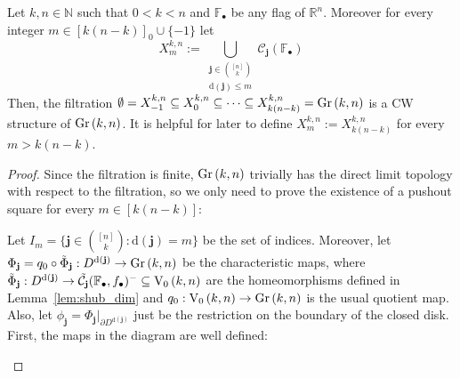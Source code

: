 \begin{theorem}\label{thm:gr_is_cw} Let $k,n\in\mathbb{N}$ such that $0<k<n$ and $\mathbb{F}_{\bullet}$ be any flag of $\mathbb{R}^n$. Moreover for every integer $m\in[k(n-k)]_0\cup\{-1\}$ let \[X_m^{k,n}:=\bigcup_{\substack{\mathbf{j}\in\binom{[n]}{k}\\\mathrm{d}(\mathbf{j})\leq m}}\mathcal{C}_{\mathbf{j}}(\mathbb{F}_{\bullet})\]
Then, the filtration $\emptyset=X_{-1}^{k,n}\subseteq X_0^{k,n}\subseteq\cdots\subseteq X_{k(n-k)}^{k,n}=\Gr{k}{n}$ is a CW structure of $\Gr{k}{n}$. It is helpful for later to define $X_m^{k,n}:=X_{k(n-k)}^{k,n}$ for every $m>k(n-k)$.
\end{theorem}
\begin{proof}
Since the filtration is finite, $\Gr{k}{n}$ trivially has the direct limit topology with respect to the filtration, so we only need to prove the existence of a pushout square for every $m\in[k(n-k)]$:
\begin{center}
\end{center}
Let $I_m=\big\{\mathbf{j}\in\binom{[n]}{k}:\mathrm{d}(\mathbf{j})=m\big\}$ be the set of indices. Moreover, let $\Phi_{\mathbf{j}}=q_0\circ\tilde{\Phi}_{\mathbf{j}}:D^{\mathrm{d}(\mathbf{j})}\to \Gr{k}{n}$ be the characteristic maps, where $\tilde{\Phi}_{\mathbf{j}}:D^{\mathrm{d}(\mathbf{j})}\to\tilde{\mathcal{C}}_{\mathbf{j}}(\mathbb{F}_{\bullet},f_{\bullet})^-\subseteq\StO{k}{n}$ are the homeomorphisms defined in Lemma~\ref{lem:shub_dim} and $q_0:\StO{k}{n}\to\Gr{k}{n}$ is the usual quotient map. Also, let $\phi_{\mathbf{j}}=\Phi_{\mathbf{j}}|_{\partial D^{\mathrm{d}(\mathbf{j})}}$ just be the restriction on the boundary of the closed disk.
First, the maps in the diagram are well defined:
\begin{i_enum}

\end{i_enum}
\end{proof}
